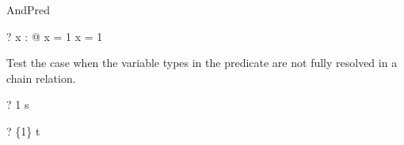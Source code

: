 \begin{zsection}
  \SECTION AndPred
\end{zsection}

\begin{zed}
  \vdash? \exists x : \nat @ x = 1 \land x = 1
\end{zed}

Test the case when the variable types in the predicate are not fully 
resolved in a chain relation.
\begin{zed} \vdash? 1 \in s \end{zed}
\begin{zed} \vdash? \{1\} \in t \end{zed}

